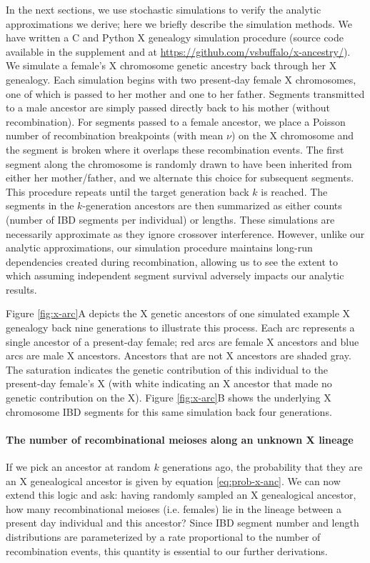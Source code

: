 \documentclass[11pt]{article}
\begin{document}
In the next sections, we use stochastic simulations to verify the analytic
approximations we derive; here we briefly describe the simulation methods. We
have written a C and Python X genealogy simulation procedure (source code
  available in the supplement and at
\url{https://github.com/vsbuffalo/x-ancestry/}). We simulate a female's X
chromosome genetic ancestry back through her X genealogy. Each simulation
begins with two present-day female X chromosomes, one of which is passed to her
mother and one to her father. Segments transmitted to a male ancestor are
simply passed directly back to his mother (without recombination). For segments
passed to a female ancestor, we place a Poisson number of recombination
breakpoints (with mean $\nu$) on the X chromosome and the segment is broken
where it overlaps these recombination events. The first segment along the
chromosome is randomly drawn to have been inherited from either her
mother/father, and we alternate this choice for subsequent segments. This
procedure repeats until the target generation back $k$ is reached. The segments
in the $k$-generation ancestors are then summarized as either counts (number of
IBD segments per individual) or lengths.  These simulations are necessarily
approximate as they ignore crossover interference.  However, unlike our
analytic approximations, our simulation procedure maintains long-run
dependencies created during recombination, allowing us to see the extent to
which assuming independent segment survival adversely impacts our analytic
results.

Figure \ref{fig:x-arc}A depicts the X genetic ancestors of one simulated
example X genealogy back nine generations to illustrate this process. Each arc
represents a single ancestor of a present-day female; red arcs are female X
ancestors and blue arcs are male X ancestors. Ancestors that are not X
ancestors are shaded gray. The saturation indicates the genetic contribution of
this individual to the present-day female's X (with white indicating an X
ancestor that made no genetic contribution on the X). Figure \ref{fig:x-arc}B
shows the underlying X chromosome IBD segments for this same simulation back
four generations.

\paragraph{The number of recombinational meioses along an unknown X lineage}

If we pick an ancestor at random $k$ generations ago, the probability that they
are an X genealogical ancestor is given by equation \eqref{eq:prob-x-anc}. We
can now extend this logic and ask: having randomly sampled an X genealogical
ancestor, how many recombinational meioses (i.e. females) lie in the lineage
between a present day individual and this ancestor? Since IBD segment number
and length distributions are parameterized by a rate proportional to the number
of recombination events, this quantity is essential to our further derivations.
\end{document}
